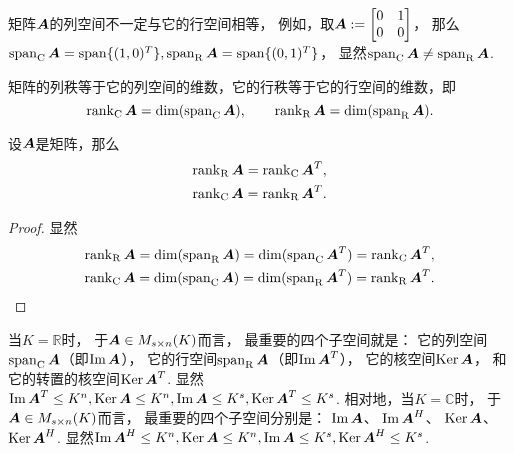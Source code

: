 矩阵\(\vb{A}\)的列空间不一定与它的行空间相等，
例如，取\(
	\vb{A}
	\defeq
	\begin{bmatrix}
		0 & 1 \\
		0 & 0
	\end{bmatrix}
\)，
那么\(
	\SpanC\vb{A}
	= \Span\{(1,0)^T\},
	\SpanR\vb{A}
	= \Span\{(0,1)^T\}
\)，
显然\(\SpanC\vb{A} \neq \SpanR\vb{A}\).

矩阵的列秩等于它的列空间的维数，它的行秩等于它的行空间的维数，即\begin{equation*}
	\RankC\vb{A} = \dim(\SpanC\vb{A}),
	\qquad
	\RankR\vb{A} = \dim(\SpanR\vb{A}).
\end{equation*}

\begin{proposition}\label{theorem:向量空间.矩阵的行秩与列秩分别等于它的转置矩阵的列秩与行秩}
设\(\vb{A}\)是矩阵，那么\begin{gather}
	\RankR\vb{A} = \RankC\vb{A}^T, \\
	\RankC\vb{A} = \RankR\vb{A}^T.
\end{gather}
\begin{proof}
显然\begin{gather*}
	\RankR\vb{A}
	= \dim(\SpanR\vb{A})
	= \dim(\SpanC\vb{A}^T)
	= \RankC\vb{A}^T, \\
	\RankC\vb{A}
	= \dim(\SpanC\vb{A})
	= \dim(\SpanR\vb{A}^T)
	= \RankR\vb{A}^T.
	\qedhere
\end{gather*}
\end{proof}
\end{proposition}

当\(K = \mathbb{R}\)时，
于\(\vb{A} \in M_{s \times n}(K)\)而言，
最重要的四个子空间就是：
它的列空间\(\SpanC\vb{A}\)（即\(\Im\vb{A}\)），
它的行空间\(\SpanR\vb{A}\)（即\(\Im\vb{A}^T\)），
它的核空间\(\Ker\vb{A}\)，
和它的转置的核空间\(\Ker\vb{A}^T\).
显然\(
	\Im\vb{A}^T \leq K^n,
	\Ker\vb{A} \leq K^n,
	\Im\vb{A} \leq K^s,
	\Ker\vb{A}^T \leq K^s
\).
相对地，当\(K = \mathbb{C}\)时，
于\(\vb{A} \in M_{s \times n}(K)\)而言，
最重要的四个子空间分别是：
\(\Im\vb{A}\)、
\(\Im\vb{A}^H\)、
\(\Ker\vb{A}\)、
\(\Ker\vb{A}^H\).
显然\(
	\Im\vb{A}^H \leq K^n,
	\Ker\vb{A} \leq K^n,
	\Im\vb{A} \leq K^s,
	\Ker\vb{A}^H \leq K^s
\).

